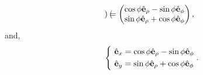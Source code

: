 \documentclass[main.tex]{subfiles}
\begin{document}
\begin{sol}
\begin{equation}
\begin{pmatrix}
    \end{pmatrix} = \begin{pmatrix}
        \cos\phi\hat{\vb{e}}_{\rho} - \sin\phi\hat{\vb{e}}_{\phi} \\
        \sin\phi\hat{\vb{e}}_{\rho} + \cos\phi\hat{\vb{e}}_{\phi}
    \end{pmatrix},
\end{equation}
and,
\begin{equation}
    \begin{dcases}
        ~\hat{\vb{e}}_x = \cos\phi\hat{\vb{e}}_{\rho} - \sin\phi\hat{\vb{e}}_{\phi} \\
        ~\hat{\vb{e}}_y = \sin\phi\hat{\vb{e}}_{\rho} + \cos\phi\hat{\vb{e}}_{\phi}
    \end{dcases}.
\end{equation}
\end{sol}
\end{document}
